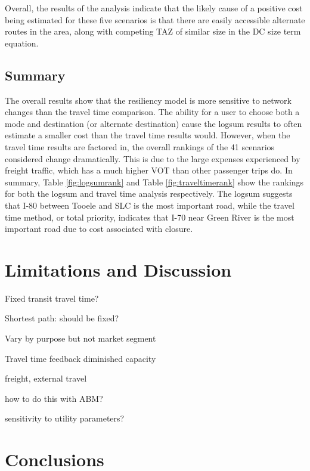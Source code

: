 \documentclass[3p, authoryear]{elsarticle} %
\begin{document}
Overall, the results of the analysis indicate that the likely cause of a
positive cost being estimated for these five scenarios is that there are easily
accessible alternate routes in the area, along with competing TAZ of similar
size in the DC size term equation.

\hypertarget{summary}{%
\subsection{Summary}\label{summary}}

The overall results show that the resiliency model is more sensitive to network
changes than the travel time comparison. The ability for a user to choose both a
mode and destination (or alternate destination) cause the logsum results to
often estimate a smaller cost than the travel time results would. However, when
the travel time results are factored in, the overall rankings of the 41
scenarios considered change dramatically. This is due to the large expenses
experienced by freight traffic, which has a much higher VOT than other passenger
trips do. In summary, Table \ref{fig:logsumrank} and Table
\ref{fig:traveltimerank} show the rankings for both the logsum and travel time
analysis respectively. The logsum suggests that I-80 between Tooele and SLC is
the most important road, while the travel time method, or total priority,
indicates that I-70 near Green River is the most important road due to cost
associated with closure.

\hypertarget{limitations-and-discussion}{%
\section{Limitations and Discussion}\label{limitations-and-discussion}}

Fixed transit travel time?

Shortest path: should be fixed?

Vary by purpose but not market segment

Travel time feedback
diminished capacity

freight, external travel

how to do this with ABM?

sensitivity to utility parameters?

\hypertarget{conclusions}{%
\section{Conclusions}\label{conclusions}}
\end{document}
